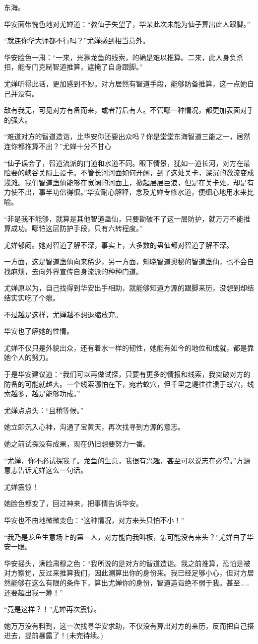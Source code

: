 \begin{this_body}
东海。

华安面带愧色地对尤婵道：“教仙子失望了，华某此次未能为仙子算出此人跟脚。”

“就连你华大师都不行吗？”尤婵感到相当意外。

华安脸色一肃：“一来，光靠龙鱼的线索，的确是难以推算。二来，此人身负杀招，能专门克制智道推算，遮掩了自身跟脚。”

尤婵听得此话，更加感到不妙。对方居然有智道手段，能够防备推算，这一点她自己并没有。

敌有我无，可见对方有备而来，或者背后有人。不管哪一种情况，都更加表面对手的强大。

“难道对方的智道造诣，比华安你还要出众吗？你是堂堂东海智道三能之一，居然连你都推算不出？”尤婵十分不甘心

“仙子误会了，智道流派的门道和水道不同。眼下情景，犹如一道长河，对方在最险要的峡谷关隘上设卡。不管长河河面如何开阔，到了这处关卡，深沉的激流变成浅滩。我们智道蛊仙能够在宽阔的河面上，掀起层层巨浪，但是在关卡处，却是有力使不出，事半功倍得很。”华安耐心解释，念及尤婵专修水道，便细心地用水来比喻。

“非是我不能够，就算是其他智道蛊仙，只要勘破不了这一层防护，就万万不能推算成功。哪怕这层防护手段，只有六转程度。”

尤婵郁闷。她对智道了解不深，事实上，大多数的蛊仙都对智道了解不深。

一方面，这是智道蛊仙向来稀少，另一方面，知晓智道奥秘的智道蛊仙，也不会自找麻烦，去向外界宣传自身流派的种种门道。

尤婵原以为，自己找得到华安出手相助，就能够知道方源的跟脚来历，没想到却结结实实吃了个瘪。

不过越是这样，尤婵越不想退缩放弃。

华安也了解她的性情。

尤婵不仅只是外貌出众，还有着水一样的韧性，她能有如今的地位和成就，都是靠她个人的努力。

于是华安建议道：“我们可以再做试探，只要有更多的情报和线索，我突破对方的防备的可能就越大。一个线索哪怕在下，宛若蚁穴，但千里之堤往往溃于蚁穴，线索越多，越是能够功成。”

尤婵点点头：“且稍等候。”

她立即沉入心神，沟通了宝黄天，再次找寻到方源的意志。

她之前试探没有成果，现在仍旧想要努力一番。

“尤婵，你不必试探我了。龙鱼的生意，我很有兴趣，甚至可以说志在必得。”方源意志告诉尤婵这么一句话。

尤婵震惊！

她脸色都变了，回过神来，把事情告诉华安。

华安也不由地微微变色：“这种情况，对方来头只怕不小！”

“我乃是龙鱼生意场上的第一人，对方能向我叫板，怎可能没有来头？”尤婵白了华安一眼。

华安摇头，满脸肃穆之色：“我所说的是对方的智道造诣。我之前推算，恐怕是被对方察觉，反过来推算我们，因此测算出你的身份来。我已经足够小心，但对方居然能够在这么有限的条件下，算出尤婵你的身份，智道造诣绝不弱于我。甚至……还要超出我一筹！”

“竟是这样？！”尤婵再次震惊。

她万万没有料到，这一次找寻华安求助，不仅没有算出对方的来历，反而把自己搭进去，提前暴露了！(未完待续。)

\end{this_body}

